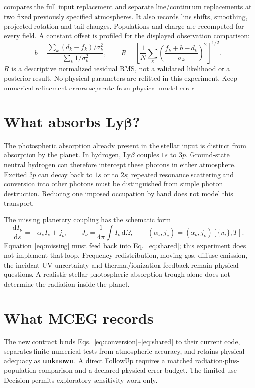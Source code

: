 \documentclass[10pt,a4paper]{article}
\begin{document}
 compares the full input replacement and
separate line/continuum replacements at two fixed previously specified
atmospheres. It also records line shifts, smoothing, projected rotation and
tail changes. Populations and charge are recomputed for every field. A
constant offset is profiled for the displayed observation comparison:
\begin{equation}
 b=\frac{\sum_k(d_k-f_k)/\sigma_k^2}{\sum_k1/\sigma_k^2},\qquad
 R=\left[\frac{1}{N}\sum_k
       \left(\frac{f_k+b-d_k}{\sigma_k}\right)^2\right]^{1/2}.
 \tag{SED-4}\label{eq:comparison}
\end{equation}
$R$ is a descriptive normalized residual RMS, not a validated likelihood or
a posterior result. No physical parameters are refitted in this experiment.
Keep numerical refinement errors separate from physical model error.

\section{What absorbs Ly\texorpdfstring{$\boldsymbol\beta$}{beta}?}
The photospheric absorption already present in the stellar input is distinct
from absorption by the planet. In hydrogen, Ly$\beta$ couples $1s$ to $3p$.
Ground-state neutral hydrogen can therefore intercept these photons in
either atmosphere. Excited $3p$ can decay back to $1s$ or to $2s$; repeated
resonance scattering and conversion into other photons must be distinguished
from simple photon destruction. Reducing one imposed occupation by hand
does not model this transport.

The missing planetary coupling has the schematic form
\begin{equation}
 \frac{\mathrm d I_\nu}{\mathrm ds}=-\alpha_\nu I_\nu+j_\nu,
 \qquad J_\nu=\frac{1}{4\pi}\int I_\nu\,\mathrm d\Omega,
 \qquad (\alpha_\nu,j_\nu)=(\alpha_\nu,j_\nu)[\{n_i\},T].
 \tag{SED-5}\label{eq:missing}
\end{equation}
Equation~\eqref{eq:missing} must feed back into Eq.~\eqref{eq:shared}; this
experiment does not implement that loop. Frequency redistribution, moving
gas, diffuse emission, the incident UV uncertainty and thermal/ionization
feedback remain physical questions. A realistic stellar photospheric
absorption trough alone does not determine the radiation inside the planet.

\section{What MCEG records}
\href{../mceg/contracts/escape.stellar_radiation.yaml}{The new contract}
binds Eqs.~\eqref{eq:conversion}--\eqref{eq:shared} to their current code,
separates finite numerical tests from atmospheric accuracy, and retains
physical adequacy as \textbf{unknown}. A direct FollowUp requires a matched
radiation-plus-population comparison and a declared physical error budget.
The limited-use Decision permits exploratory sensitivity work only.
\end{document}
